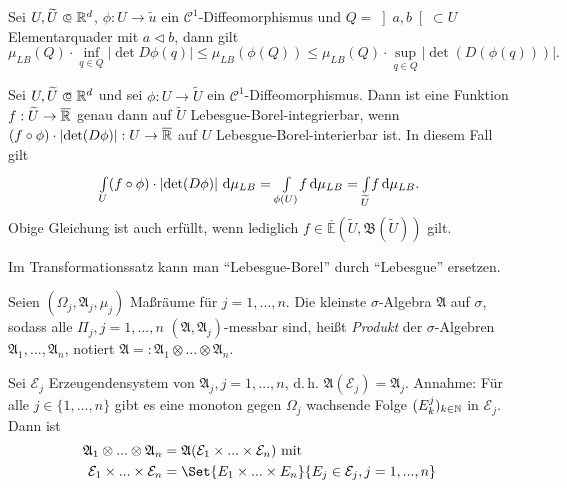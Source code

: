\documentclass{cheat-sheet}
\newcommand{\ER}{\overline\R} %
\newcommand{\Alg}{\mathfrak{A}} %
\newcommand{\Bor}{\mathfrak{B}} %
\newcommand{\E}{\mathbb{E}} %
\begin{document}
\begin{satz}
  Sei $U, \widetilde{U} \opn \R^d$, $\phi : U \to \widetilde{u}$ ein $\mathcal{C}^1$-Diffeomorphismus und $Q = \left]a, b\right[ \subset U$ Elementarquader mit $a \lhd b$, dann gilt
  \[ \mu_{LB}(Q) \cdot \inf_{q \in Q} \left|\det D \phi(q)\right| \leq \mu_{LB}(\phi(Q)) \leq \mu_{LB}(Q) \cdot \sup_{q \in Q} \left|\det(D(\phi(q)))\right|. \]
\end{satz}

\begin{satz}[Transformationssatz]
  Sei $U, \widetilde{U} \opn \R^d$ und sei $\phi : U \to \widetilde{U}$ ein $\mathcal{C}^1$-Diffeomorphismus. Dann ist eine Funktion $f : \widetilde{U} \to \ER$ genau dann auf $\widetilde{U}$ Lebesgue-Borel-integrierbar, wenn $(f \circ \phi) \cdot \left|\det(D\phi)\right| : U \to \ER$ auf $U$ Lebesgue-Borel-interierbar ist. In diesem Fall gilt
  \[ {\textstyle \int\limits_{U}^{}} (f \circ \phi) \cdot \left|\det(D\phi)\right| \,\mathrm{d} \mu_{LB} = {\textstyle \int\limits_{\phi(U)}^{}} f \,\mathrm{d} \mu_{LB} = {\textstyle \int\limits_{\widetilde{U}}^{}} f \,\mathrm{d} \mu_{LB}. \]
  Obige Gleichung ist auch erfüllt, wenn lediglich $f \in \overline{\E}(\widetilde{U}, \Bor(\widetilde{U}))$ gilt.
\end{satz}

\begin{bem}
  Im Transformationssatz kann man "`Lebesgue-Borel"' durch "`Lebesgue"' ersetzen.
\end{bem}



% 

\begin{defn}
  Seien $(\Omega_j, \Alg_j, \mu_j)$ Maßräume für $j = 1, ..., n$. Die kleinste $\sigma$-Algebra $\Alg$ auf $\sigma$, sodass alle $\Pi_j, j = 1, ..., n$ $(\Alg, \Alg_j)$-messbar sind, heißt \emph{Produkt} der $\sigma$-Algebren $\Alg_1, ..., \Alg_n$, notiert $\Alg =: \Alg_1 \otimes ... \otimes \Alg_n$.
\end{defn}

\begin{satz}
  Sei $\mathcal{E}_j$ Erzeugendensystem von $\Alg_j, j = 1, ..., n$, d.\,h. $\Alg(\mathcal{E}_j) = \Alg_j$. Annahme: Für alle $j \in \{ 1, ..., n \}$ gibt es eine monoton gegen $\Omega_j$ wachsende Folge $(E^j_k)_{k \in \mathbb{N}}$ in $\mathcal{E}_j$. Dann ist
  \begin{align*}
    \Alg_1 \otimes ... \otimes \Alg_n &= \Alg(\mathcal{E}_1 \times ... \times \mathcal{E}_n) \text{ mit }\\
    \mathcal{E}_1 \times ... \times \mathcal{E}_n &= \Set{ E_1 \times ... \times E_n }{ E_j \in \mathcal{E}_j, j = 1, ..., n }
  \end{align*}
\end{satz}
\end{document}
